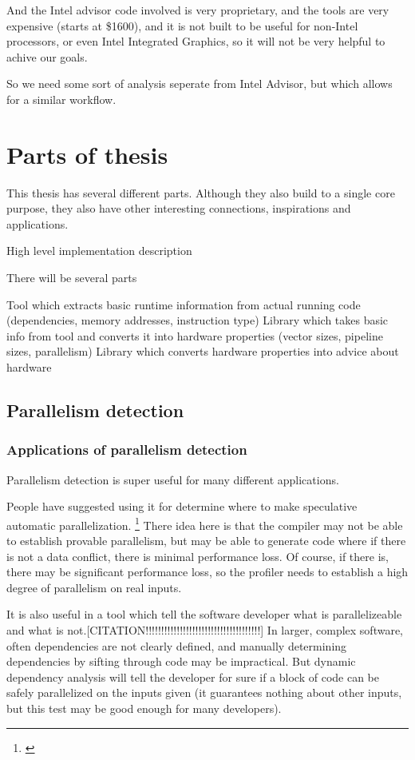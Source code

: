 \documentclass[12pt,twoside]{reedthesis}
\begin{document}
		And the Intel advisor code involved is very proprietary, and the tools are very expensive (starts at \$1600), and it is not built to be useful for non-Intel processors, or even Intel Integrated Graphics, so it will not be very helpful to achive our goals.
		
		So we need some sort of analysis seperate from Intel Advisor, but which allows for a similar workflow. 
		
	\section{Parts of thesis}
		
		This thesis has several different parts. Although they also build to a single core purpose, they also have other interesting connections, inspirations and applications. 
		
		
		High level implementation description
		
		There will be several parts
		
		Tool which extracts basic runtime information from actual running code (dependencies, memory addresses, instruction type)
		Library which takes basic info from tool and converts it into hardware properties (vector sizes, pipeline sizes, parallelism)
		Library which converts hardware properties into advice about hardware
		
	
	\subsection{Parallelism detection}
		
		\subsubsection{Applications of parallelism detection}
		
		Parallelism detection is super useful for many different applications. 
		
		People have suggested using it for determine where to make speculative automatic parallelization. \footnote{\cite{Chen:2004}} There idea here is that the compiler may not be able to establish provable parallelism, but may be able to generate code where if there is not a data conflict, there is minimal performance loss. Of course, if there is, there may be significant performance loss, so the profiler needs to establish a high degree of parallelism on real inputs. 
		
		It is also useful in a tool which tell the software developer what is parallelizeable and what is not.[CITATION!!!!!!!!!!!!!!!!!!!!!!!!!!!!!!!!!!!!!]
		In larger, complex software, often dependencies are not clearly defined, and manually determining dependencies by sifting through code may be impractical. But dynamic dependency analysis will tell the developer for sure if a block of code can be safely parallelized on the inputs given (it guarantees nothing about other inputs, but this test may be good enough for many developers).
		
\end{document}
